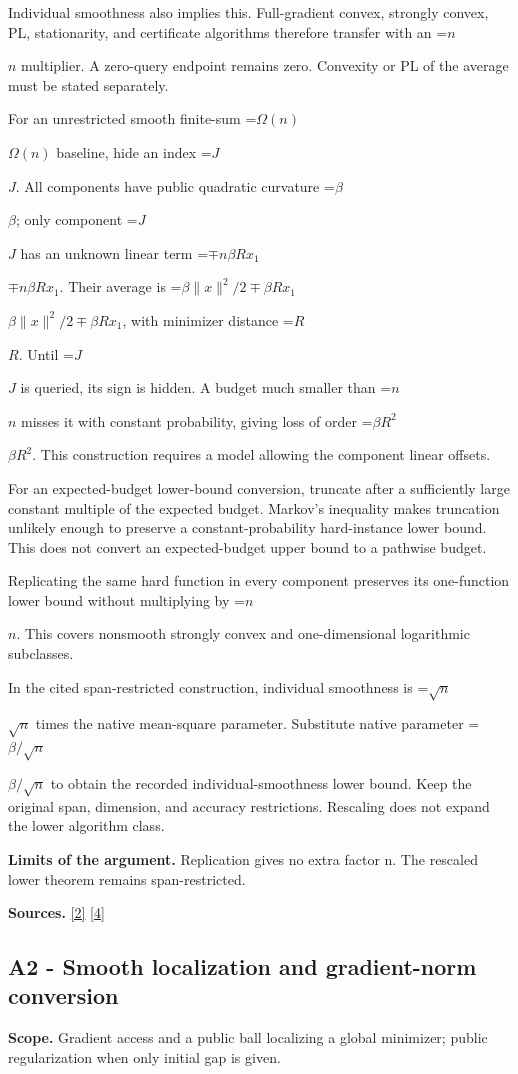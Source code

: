 \documentclass[10pt,a4paper]{article}
\newcommand{\AtlasMath}[1]{\par\begingroup\centering\setbox0=\hbox{$\displaystyle #1$}\ifdim\wd0>1.4\linewidth\typeout{ATLAS WIDE FORMULA: \the\wd0}\fi\ifdim\wd0>\linewidth\resizebox{\linewidth}{!}{\box0}\else\box0\fi\par\endgroup}
\newcommand{\AtlasInlineMath}[1]{\begingroup\setbox0=\hbox{$#1$}\ifdim\wd0>.4\linewidth\endgroup\AtlasMath{#1}\else\endgroup$#1$\fi}
\begin{document}
Individual smoothness also implies this. Full-gradient convex, strongly convex, PL, stationarity, and certificate algorithms therefore transfer with an \AtlasInlineMath{n} multiplier. A zero-query endpoint remains zero. Convexity or PL of the average must be stated separately.

For an unrestricted smooth finite-sum \AtlasInlineMath{\Omega(n)} baseline, hide an index \AtlasInlineMath{J}. All components have public quadratic curvature \AtlasInlineMath{\beta}; only component \AtlasInlineMath{J} has an unknown linear term \AtlasInlineMath{\mp n\beta R x_1}. Their average is
\AtlasInlineMath{\beta\|x\|^2/2\mp\beta Rx_1}, with minimizer distance \AtlasInlineMath{R}. Until \AtlasInlineMath{J} is queried, its sign is hidden. A budget much smaller than \AtlasInlineMath{n} misses it with constant probability, giving loss of order \AtlasInlineMath{\beta R^2}. This construction requires a model allowing the component linear offsets.

For an expected-budget lower-bound conversion, truncate after a sufficiently large constant multiple of the expected budget. Markov's inequality makes truncation unlikely enough to preserve a constant-probability hard-instance lower bound. This does not convert an expected-budget upper bound to a pathwise budget.

Replicating the same hard function in every component preserves its one-function lower bound without multiplying by \AtlasInlineMath{n}. This covers nonsmooth strongly convex and one-dimensional logarithmic subclasses.

In the cited span-restricted construction, individual smoothness is \AtlasInlineMath{\sqrt n} times the native mean-square parameter. Substitute native parameter \AtlasInlineMath{\beta/\sqrt n} to obtain the recorded individual-smoothness lower bound. Keep the original span, dimension, and accuracy restrictions. Rescaling does not expand the lower algorithm class.

\textbf{Limits of the argument.} Replication gives no extra factor n. The rescaled lower theorem remains span-restricted.

\textbf{Sources.} \href{https://proceedings.mlr.press/v97/zhou19b/zhou19b.pdf}{[2]} \href{https://arxiv.org/pdf/1405.4980}{[4]}

\subsection{A2 - Smooth localization and gradient-norm conversion}
\textbf{Scope.} Gradient access and a public ball localizing a global minimizer; public regularization when only initial gap is given.
\end{document}
